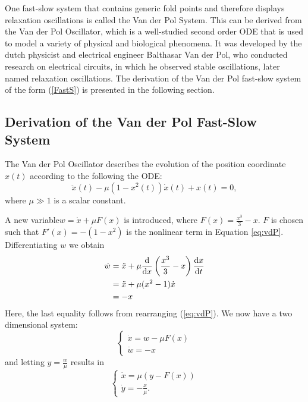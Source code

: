 
One fast-slow system that contains generic fold points and therefore displays relaxation oscillations is called the Van der Pol System. This can be derived from the Van der Pol Oscillator, which is a well-studied second order ODE that is used to model a variety of physical and biological phenomena. It was developed by the dutch physicist and electrical engineer Balthasar Van der Pol, who conducted research on electrical circuits, in which he observed stable oscillations, later named relaxation oscillations.
The derivation of the Van der Pol fast-slow system of the form (\ref{FastS}) is presented in the following section.

\subsection{Derivation of the Van der Pol Fast-Slow System}

The Van der Pol Oscillator describes the evolution of the position coordinate \(x(t)\) according to the following the ODE:
\begin{equation} \label{eq:vdP}
\ddot{x}(t)-\mu\left(1-x^2(t)\right)\dot{x}(t)+x(t)=0,   
\end{equation}
where \(\mu \gg 1\) is a scalar constant. \par  

A new variable\(w=\dot{x}+\mu F(x)\) is introduced, where \(F(x)=\frac{x^3}{3}-x\). $F$ is chosen such that  \(F'(x)=-(1-x^2)\) is the nonlinear term in Equation \ref{eq:vdP}. Differentiating \(w\) we obtain
\begin{align*}
    \dot{w}&=\ddot{x}+\mu\od{}{x}\left(\frac{x^3}{3}-x\right)\od{x}{t}\\
    & =\ddot{x}+\mu(x^2-1)\dot{x}\\
    &= -x
\end{align*}
Here, the last equality follows from rearranging (\ref{eq:vdP}). We now have a two dimensional system:
\[\begin{cases} \dot{x}=w-\mu F(x)\\
 \dot{w}=-x\end{cases}\]
and letting \(y=\frac{w}{\mu}\) results in
 \[\begin{cases} \dot{x}=\mu\left(y-F(x)\right)\\
 \dot{y}=-\frac{x}{\mu}.\end{cases}\]

